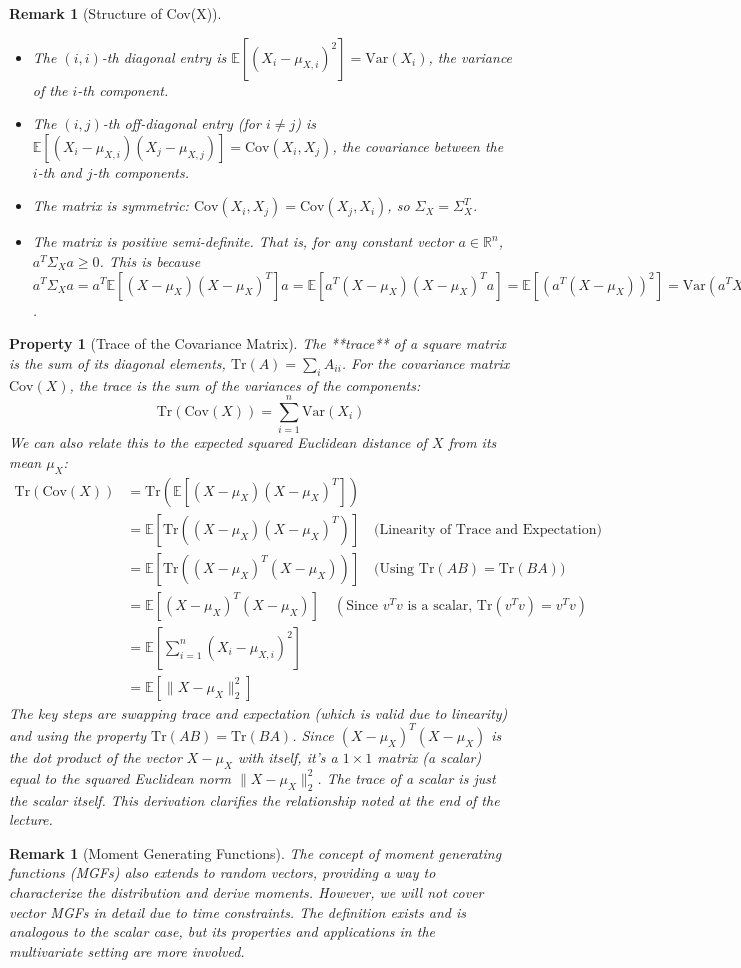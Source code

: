 \documentclass[11pt]{article}
\newtheorem{property}[theorem]{Property}
\newtheorem{remark}[theorem]{Remark}
\theoremstyle{definition} %
\newcommand{\R}{\mathbb{R}} %
\newcommand{\E}{\mathbb{E}} %
\newcommand{\Var}{\text{Var}} %
\newcommand{\Cov}{\text{Cov}} %
\newcommand{\Tr}{\text{Tr}} %
\begin{document}
\begin{remark}[Structure of Cov(X)]
    \begin{itemize}
        \item The $(i, i)$-th diagonal entry is $\E[(X_i - \mu_{X,i})^2] = \Var(X_i)$, the variance of the $i$-th component.
        \item The $(i, j)$-th off-diagonal entry (for $i \neq j$) is $\E[(X_i - \mu_{X,i})(X_j - \mu_{X,j})] = \Cov(X_i, X_j)$, the covariance between the $i$-th and $j$-th components.
        \item The matrix is symmetric: $\Cov(X_i, X_j) = \Cov(X_j, X_i)$, so $\Sigma_X = \Sigma_X^T$.
        \item The matrix is positive semi-definite. That is, for any constant vector $a \in \R^n$, $a^T \Sigma_X a \ge 0$. This is because $a^T \Sigma_X a = a^T \E[(X - \mu_X)(X - \mu_X)^T] a = \E[a^T (X - \mu_X)(X - \mu_X)^T a] = \E[(a^T(X - \mu_X))^2] = \Var(a^T X) \ge 0$.
    \end{itemize}
\end{remark}

\begin{property}[Trace of the Covariance Matrix]
The **trace** of a square matrix is the sum of its diagonal elements, $\Tr(A) = \sum_i A_{ii}$.
For the covariance matrix $\Cov(X)$, the trace is the sum of the variances of the components:
\[ \Tr(\Cov(X)) = \sum_{i=1}^n \Var(X_i) \]
We can also relate this to the expected squared Euclidean distance of $X$ from its mean $\mu_X$:
\begin{align*} \Tr(\Cov(X)) &= \Tr(\E[(X - \mu_X)(X - \mu_X)^T]) \\ &= \E[\Tr((X - \mu_X)(X - \mu_X)^T)] \quad \text{(Linearity of Trace and Expectation)} \\ &= \E[\Tr((X - \mu_X)^T(X - \mu_X))] \quad \text{(Using } \Tr(AB) = \Tr(BA) \text{)} \\ &= \E[ (X - \mu_X)^T(X - \mu_X) ] \quad (\text{Since } v^Tv \text{ is a scalar, } \Tr(v^Tv)=v^Tv) \\ &= \E\left[ \sum_{i=1}^n (X_i - \mu_{X,i})^2 \right] \\ &= \E[ \| X - \mu_X \|_2^2 ] \end{align*}
The key steps are swapping trace and expectation (which is valid due to linearity) and using the property $\Tr(AB) = \Tr(BA)$. Since $(X - \mu_X)^T(X - \mu_X)$ is the dot product of the vector $X-\mu_X$ with itself, it's a $1 \times 1$ matrix (a scalar) equal to the squared Euclidean norm $\|X - \mu_X\|_2^2$. The trace of a scalar is just the scalar itself. This derivation clarifies the relationship noted at the end of the lecture.
\end{property}

\begin{remark}[Moment Generating Functions]
The concept of moment generating functions (MGFs) also extends to random vectors, providing a way to characterize the distribution and derive moments. However, we will not cover vector MGFs in detail due to time constraints. The definition exists and is analogous to the scalar case, but its properties and applications in the multivariate setting are more involved.
\end{remark}
\end{document}
